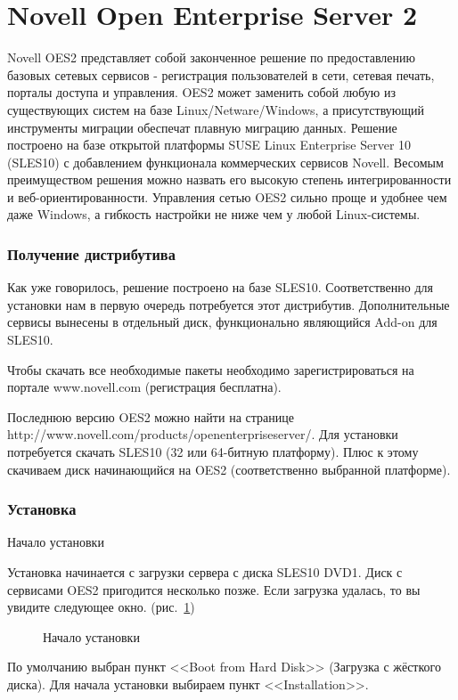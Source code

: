 \part{Novell Open Enterprise Server 2}
Novell OES2 представляет собой законченное решение по предоставлению базовых сетевых сервисов - регистрация пользователей в сети, сетевая печать, порталы доступа и управления. OES2 может заменить собой любую из существующих систем на базе Linux/Netware/Windows, а присутствующий инструменты миграции обеспечат плавную миграцию данных. Решение построено на базе открытой платформы SUSE Linux Enterprise Server 10 (SLES10) с добавлением функционала коммерческих сервисов Novell. Весомым преимуществом решения можно назвать его высокую степень интегрированности и веб-ориентированности. Управления сетью OES2 сильно проще и удобнее чем даже Windows, а гибкость настройки не ниже чем у любой Linux-системы.

\section{Получение дистрибутива}
Как уже говорилось, решение построено на базе SLES10. Соответственно для установки нам в первую очередь потребуется этот дистрибутив. Дополнительные сервисы вынесены в отдельный диск, функционально являющийся Add-on для SLES10.\par
Чтобы скачать все необходимые пакеты необходимо зарегистрироваться на портале www.novell.com (регистрация бесплатна).\par
Последнюю версию OES2 можно найти на странице\\
http://www.novell.com/products/openenterpriseserver/. Для установки потребуется скачать SLES10 (32 или 64-битную платформу). Плюс к этому скачиваем диск начинающийся на OES2 (соответственно выбранной платформе).\\
\clearpage

\section{Установка}
Начало установки

Установка начинается с загрузки сервера с диска SLES10 DVD1. Диск с сервисами OES2 пригодится несколько позже. Если загрузка удалась, то вы увидите следующее окно. (рис.~\ref{fig1})
\begin{figure}[H]
\caption{Начало установки}
\label{fig1}
\end{figure}
По умолчанию выбран пункт <<Boot from Hard Disk>> (Загрузка с жёсткого диска). Для начала установки выбираем пункт <<Installation>>.
\clearpage

